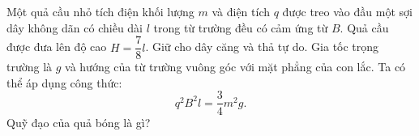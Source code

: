 \begin{vd}
    Một quả cầu nhỏ tích điện khối lượng $m$ và điện tích $q$ được treo vào đầu một sợi dây không dãn có chiều dài $l$ trong từ trường đều có cảm ứng từ $B$. Quả cầu được đưa lên độ cao $H=\dfrac{7}{8}l$. Giữ cho dây căng và thả tự do. Gia tốc trọng trường là $g$ và hướng của từ trường vuông góc với mặt phẳng của con lắc. Ta có thể áp dụng công thức: 
    $$q^2B^2l=\dfrac{3}{4}m^2g.$$ 
    Quỹ đạo của quả bóng là gì? 
    
\begin{center}
    
    \begin{tikzpicture}[x=0.75pt,y=0.75pt,yscale=-1,xscale=1]
    

\end{tikzpicture}
\end{center}
\end{vd}
